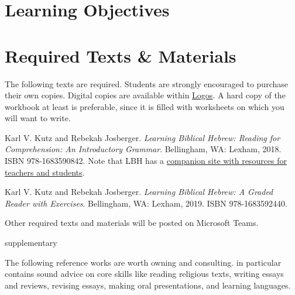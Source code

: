 \documentclass[titlepage]{article}
\newcommand\incl{../includes}
\begin{document}


\section{Learning Objectives}
\label{objectives}
\edobject

\section{Required Texts \& Materials}
\label{texts}

The following texts are required. Students are strongly encouraged to
purchase their own copies. Digital copies are available within
\href{https://www.logos.com/product/177582/learning-biblical-hebrew-bundle}{Logos}.
A hard copy of the workbook at least is preferable, since it is filled
with worksheets on which you will want to write.

\begingroup
\renewcommand{\section}[2]{}%
\begin{thebibliography}{Workbook}%

    Karl V. Kutz and Rebekah Josberger.
    \emph{Learning Biblical Hebrew: Reading for Comprehension: An Introductory Grammar}.
    Bellingham, WA: Lexham, 2018. ISBN 978-1683590842.
    Note that LBH has a \href{http://www.learningbiblicalhebrew.com/}{companion site with resources for teachers and students}.

    Karl V. Kutz and Rebekah Josberger.
    \emph{Learning Biblical Hebrew: A Graded Reader with Exercises}.
    Bellingham, WA: Lexham, 2019. ISBN 978-1683592440.

\end{thebibliography}
\endgroup

Other required texts and materials will be posted on Microsoft Teams.

\section{Supplementary Texts}
\label{supplementary}

The following reference works are worth owning and consulting.
\cite{rlgs} in particular contains sound advice on core skills like
reading religious texts, writing essays and reviews, revising essays,
making oral presentations, and learning languages.
\end{document}
